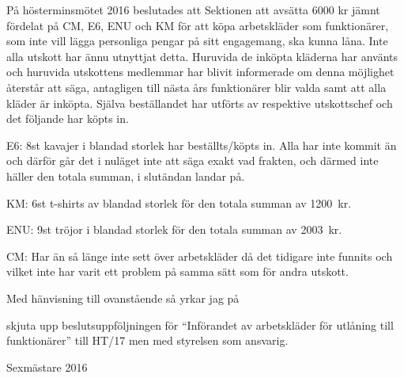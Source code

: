 \documentclass[../_main/handlingar.tex]{subfiles}
\begin{document}

På hösterminsmötet 2016 beslutades att Sektionen att avsätta 6000 kr jämnt fördelat på CM, E6, ENU och KM för att köpa arbetskläder som funktionärer, som inte vill lägga personliga pengar på sitt engagemang, ska kunna låna. Inte alla utskott har ännu utnyttjat detta. Huruvida de inköpta kläderna har använts och huruvida utskottens medlemmar har blivit informerade om denna möjlighet återstår att säga, antagligen till nästa års funktionärer blir valda samt att alla kläder är inköpta.  Själva beställandet har utförts av respektive utskottschef och det följande har köpts in.

\begin{dashlist}
    \item E6: 8st kavajer i blandad storlek har beställts/köpts in. Alla har inte kommit än och därför går det i nuläget inte att säga exakt vad frakten, och därmed inte häller den totala summan, i slutändan landar på.
    \item KM: 6st t-shirts av blandad storlek för den totala summan av \SI{1200}{kr}.
    \item ENU: 9st tröjor i blandad storlek för den totala summan av \SI{2003}{kr}.
    \item CM: Har än så länge inte sett över arbetskläder då det tidigare inte funnits och vilket inte har varit ett problem på samma sätt som för andra utskott.
\end{dashlist}

Med hänvisning till ovanstående så yrkar jag på

\begin{attsatser}
    \att skjuta upp beslutsuppföljningen för ``Införandet av arbetskläder för utlåning till funktionärer'' till HT/17 men med styrelsen som ansvarig.
\end{attsatser}

\begin{signatures}{1}
    \mvh
    \signature{Martin Gemborn Nilsson}{Sexmästare 2016}
\end{signatures}
\end{document}

